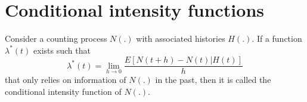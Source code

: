 \section{Conditional intensity functions}
\begin{Definition}{}	
Consider a counting process $N(.)$ with associated histories $H(.)$. If a function $\lambda^{*}(t)$ exists such that
 $$\lambda^{*}(t)= \lim_{h \to 0} \dfrac{E[N(t + h)-N(t) |H(t)]}{h}$$
that only relies on information of $N(.)$ in the past, then it is called the
conditional intensity function of $N(.)$.
\end{Definition}
